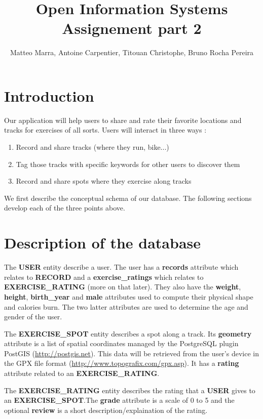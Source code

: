 \documentclass[a4paper]{article}
\title{Open Information Systems\\Assignement part 2 }
\author{Matteo Marra, Antoine Carpentier, Titouan Christophe, Bruno Rocha Pereira}
\begin{document}
\maketitle


\section{Introduction}

Our application will help users to share and rate their favorite locations and tracks for exercises of all sorts. Users will interact in three ways : 

\begin{enumerate}
    \item Record and share tracks (where they run, bike...)
    \item Tag those tracks with specific keywords for other users to discover them
    \item Record and share spots where they exercise along tracks
\end{enumerate}

We first describe the conceptual schema of our database. The following sections develop each of the three points above.

\section{Description of the database}

The \textbf{USER} entity describe a user. The user has a \textbf{records} attribute which relates to \textbf{RECORD} and a \textbf{exercise\_ratings} which relates to \textbf{EXERCISE\_RATING} (more on that later). They also have the \textbf{weight}, \textbf{height}, \textbf{birth\_year} and \textbf{male} attributes used to compute their physical shape and calories burn. The two latter attributes are used to determine the age and gender of the user.

The \textbf{EXERCISE\_SPOT} entity describes a spot along a track. Its \textbf{geometry} attribute is a list of spatial coordinates managed by the PostgreSQL plugin PostGIS (\url{http://postgis.net}). This data will be retrieved from the user's device in the GPX file format (\url{http://www.topografix.com/gpx.asp}). It has a \textbf{rating} attribute related to an \textbf{EXERCISE\_RATING}.

The \textbf{EXERCISE\_RATING} entity describes the rating that a \textbf{USER} gives to an \textbf{EXERCISE\_SPOT}.The \textbf{grade} attribute is a scale of 0 to 5 and the optional \textbf{review} is a short description/explaination of the rating.
\end{document}
